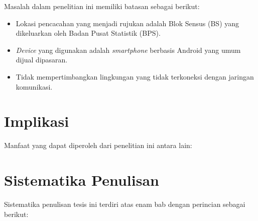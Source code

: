 Masalah dalam penelitian ini memiliki batasan sebagai berikut:

\begin{itemize}
\item Lokasi pencacahan yang menjadi rujukan adalah Blok Sensus (BS) yang dikeluarkan oleh Badan Pusat Statistik (BPS).
\item \textit{Device} yang digunakan adalah \textit{smartphone} berbasis Android yang umum dijual dipasaran.
\item Tidak mempertimbangkan lingkungan yang tidak terkoneksi dengan jaringan komunikasi.
\end{itemize}


\section{Implikasi}

Manfaat yang dapat diperoleh dari penelitian ini antara lain:


\section{Sistematika Penulisan}

Sistematika penulisan tesis ini terdiri atas enam bab dengan perincian sebagai berikut:
